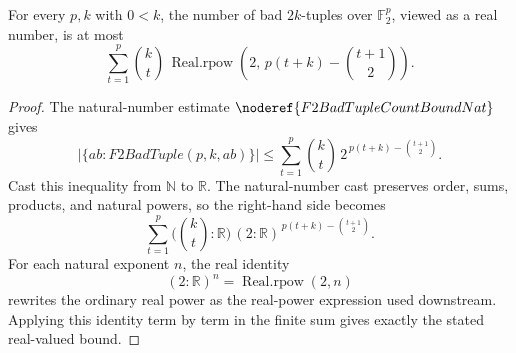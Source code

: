 \begin{helper}
For every \(p,k\) with \(0<k\), the number of bad \(2k\)-tuples over
\(\mathbb F_2^p\), viewed as a real number, is at most
\[
  \sum_{t=1}^p
    \binom{k}{t}\,
    \operatorname{Real.rpow}\!\left(2,\,
      p(t+k)-\binom{t+1}{2}\right).
\]
\end{helper}
\begin{proof}
The natural-number estimate \(\noderef{F2BadTupleCountBoundNat}\) gives
\[
  \left|\{ab:F2BadTuple(p,k,ab)\}\right|
  \le
  \sum_{t=1}^p
    \binom{k}{t}\,
    2^{\,p(t+k)-\binom{t+1}{2}}.
\]
Cast this inequality from \(\mathbb N\) to \(\mathbb R\). The natural-number
cast preserves order, sums, products, and natural powers, so the right-hand
side becomes
\[
  \sum_{t=1}^p
    \bigl(\binom{k}{t}:\mathbb R\bigr)\,
    (2:\mathbb R)^{\,p(t+k)-\binom{t+1}{2}}.
\]
For each natural exponent \(n\), the real identity
\[
  (2:\mathbb R)^n=\operatorname{Real.rpow}(2,n)
\]
rewrites the ordinary real power as the real-power expression used downstream.
Applying this identity term by term in the finite sum gives exactly the stated
real-valued bound.
\end{proof}
